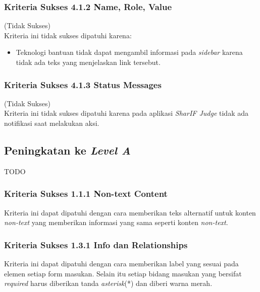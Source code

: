 \subsubsection{Kriteria Sukses 4.1.2 Name, Role, Value}
\label{subsubsec:kepatuhan_kriteria_4.1.2}
(Tidak Sukses) \\

Kriteria ini tidak sukses dipatuhi karena: 
\begin{itemize}
	\item Teknologi bantuan tidak dapat mengambil informasi pada \textit{sidebar} karena tidak ada teks yang menjelaskan link tersebut.
\end{itemize}

\subsubsection{Kriteria Sukses 4.1.3 Status Messages}
\label{subsubsec:kepatuhan_kriteria_4.1.3}
(Tidak Sukses) \\

Kriteria ini tidak sukses dipatuhi karena pada aplikasi \textit{SharIF Judge} tidak ada notifikasi saat melakukan aksi.

\subsection{Peningkatan ke \textit{Level A}}
\label{subsec:peningkatan_level_A}
TODO

\subsubsection{Kriteria Sukses 1.1.1 Non-text Content}
\label{subsubsec:peningkatan_A_1.1.1}

Kriteria ini dapat dipatuhi dengan cara memberikan teks alternatif untuk konten \textit{non-text} yang memberikan informasi yang sama seperti konten \textit{non-text}.

\subsubsection{Kriteria Sukses 1.3.1 Info dan Relationships}
\label{subsubsec:peningkatan_A_1.3.1}

Kriteria ini dapat dipatuhi dengan cara memberikan label yang sesuai pada elemen setiap form masukan. Selain itu setiap bidang masukan yang bersifat \textit{required} harus diberikan tanda \textit{asterisk}(*) dan diberi warna merah.

